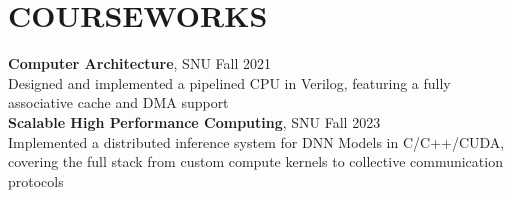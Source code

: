 \section*{COURSEWORKS}

\noindent
\textbf{Computer Architecture}, SNU \hfill Fall 2021 \\
Designed and implemented a pipelined CPU in Verilog, featuring a fully associative cache and DMA support \\

\noindent
\textbf{Scalable High Performance Computing}, SNU \hfill Fall 2023 \\
Implemented a distributed inference system for DNN Models in C/C++/CUDA, covering the full stack from custom compute kernels to collective communication protocols
\\